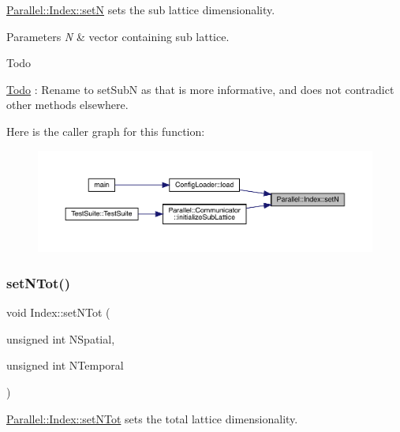 \mbox{\hyperlink{class_parallel_1_1_index_acbf43868aa2efc7ecf63b5b490fc00a0}{Parallel\+::\+Index\+::setN}} sets the sub lattice dimensionality. 


\begin{DoxyParams}{Parameters}
{\em N} & vector containing sub lattice.\\
\hline
\end{DoxyParams}
\begin{DoxyRefDesc}{Todo}
\item[\mbox{\hyperlink{todo__todo000009}{Todo}}]\+: Rename to set\+SubN as that is more informative, and does not contradict other methods elsewhere. \end{DoxyRefDesc}
Here is the caller graph for this function\+:
\nopagebreak
\begin{figure}[H]
\begin{center}
\leavevmode
\includegraphics[width=350pt]{class_parallel_1_1_index_acbf43868aa2efc7ecf63b5b490fc00a0_icgraph}
\end{center}
\end{figure}
\mbox{\label{class_parallel_1_1_index_a125dc4d990ded636c91b959474c27d1f}} 
\subsubsection{\texorpdfstring{setNTot()}{setNTot()}}
{\footnotesize\ttfamily void Index\+::set\+N\+Tot (\begin{DoxyParamCaption}\item[{unsigned int}]{N\+Spatial,  }\item[{unsigned int}]{N\+Temporal }\end{DoxyParamCaption})\hspace{0.3cm}{\ttfamily [static]}}



\mbox{\hyperlink{class_parallel_1_1_index_a125dc4d990ded636c91b959474c27d1f}{Parallel\+::\+Index\+::set\+N\+Tot}} sets the total lattice dimensionality. 


